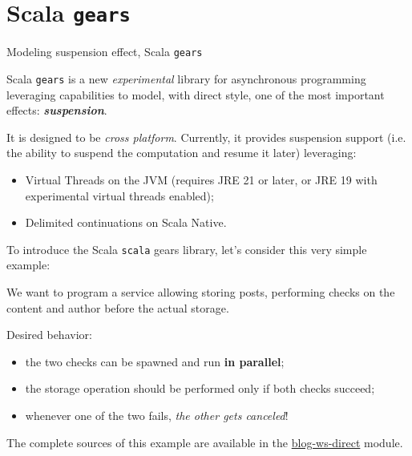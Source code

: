 \documentclass[aspectratio=1610,xcolor=dvipsnames]{beamer}
\begin{document}
\section{Scala \texttt{gears}}
\begin{frame}{Modeling suspension effect, Scala \texttt{gears} \cite{gears}}
  \begin{block}{}
    Scala \texttt{gears} is a new \textit{experimental} library for asynchronous programming leveraging capabilities to model, with direct style, one of the most important effects: \textbf{\textit{suspension}}.
  \end{block}
  It is designed to be \emph{cross platform}. Currently, it provides suspension support (i.e. the ability to suspend the computation and resume it later) leveraging:
  \begin{itemize}
    \item Virtual Threads on the JVM (requires JRE 21 or later, or JRE 19 with experimental virtual threads enabled);
    \item Delimited continuations on Scala Native.
  \end{itemize}
\end{frame}
%
\begin{frame}
  To introduce the Scala \texttt{scala} gears library, let's consider this very simple example:
  \begin{example}[1]
    We want to program a service allowing storing posts, performing checks on the content and author before the actual storage.
  \end{example}
  Desired behavior:
  \begin{itemize}
    \item the two checks can be spawned and run \textbf{in parallel};
    \item the storage operation should be performed only if both checks succeed;
    \item whenever one of the two fails, \emph{the other gets canceled}!
  \end{itemize}
  \vspace*{0.5cm}
  \footnotesize
  The complete sources of this example are available in the \href{https://github.com/tassiLuca/direct-style-experiments/tree/master/blog-ws-direct}{blog-ws-direct} module.
\end{frame}
%
\end{document}
